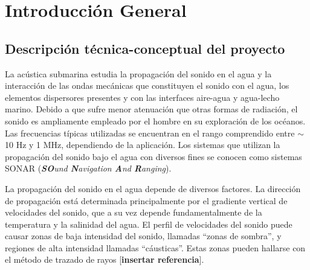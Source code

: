 
\chapter{Introducción General} %

\label{Chapter1} %
\label{IntroGeneral}


\newcommand{\keyword}[1]{\textbf{#1}}
\newcommand{\tabhead}[1]{\textbf{#1}}
\newcommand{\code}[1]{\texttt{#1}}
\newcommand{\file}[1]{\texttt{\bfseries#1}}
\newcommand{\option}[1]{\texttt{\itshape#1}}
\newcommand{\grados}{$^{\circ}$}



\section{Descripción técnica-conceptual del proyecto}


La acústica submarina estudia la propagación del sonido en el agua y la interacción de las ondas mecánicas que constituyen el sonido con el agua, los elementos dispersores presentes y con las interfaces aire-agua y agua-lecho marino.  Debido a que sufre menor atenuación que otras formas de radiación, el sonido es ampliamente empleado  por el hombre en su exploración de los océanos.  Las frecuencias típicas utilizadas se encuentran en el rango comprendido entre $\sim$10 Hz y 1 MHz, dependiendo de la aplicación.  Los sistemas que utilizan la propagación del sonido bajo el agua con diversos fines se conocen como sistemas SONAR (\textit{\textbf{SO}und \textbf{N}avigation \textbf{A}nd \textbf{R}anging}).

La propagación del sonido en el agua depende de diversos factores.  La dirección de propagación está determinada principalmente por el gradiente vertical de velocidades del sonido, que a su vez depende fundamentalmente de la temperatura y la salinidad del agua.  El perfil de velocidades del sonido puede causar zonas de baja intensidad del sonido, llamadas ``zonas de sombra'', y regiones de alta intensidad llamadas ``cáusticas''. Estas zonas pueden hallarse con el método de trazado de rayos [\textbf{insertar referencia}].

